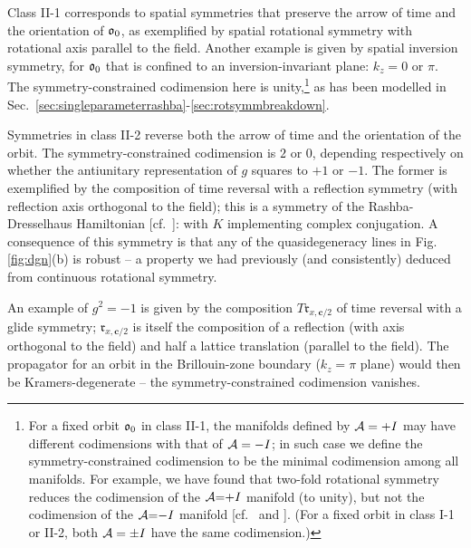 \documentclass[aps, showpacs, twocolumn, notitlepage, superscriptaddress]{revtex4-1}
\begin{document}
Class II-1 corresponds to spatial symmetries that preserve the arrow of time and the orientation of $\mathfrak{o}_0$, as exemplified by spatial rotational symmetry with rotational axis parallel to the field. Another example is given by spatial inversion symmetry, for $\mathfrak{o}_0$ that is confined to an inversion-invariant plane: $k_z=0$ or $\pi$. The symmetry-constrained codimension here is unity,\footnote{For a fixed orbit $\mathfrak{o}_0$ in class II-1, the manifolds defined by ${\cal A}=+I$ may have different codimensions with that of ${\cal A}=-I$; in such case we define the symmetry-constrained codimension to be the minimal codimension among all manifolds. For example, we have found that two-fold rotational symmetry reduces the codimension of the ${\cal A}{=}{+}I$ manifold (to unity), but not the codimension of the ${\cal A}{=}{-}I$ manifold [cf.\  and ]. (For a fixed orbit in class I-1 or II-2, both ${\cal A}=\pm I$ have the same codimension.) } as has been modelled in Sec.\ \ref{sec:singleparameterrashba}-\ref{sec:rotsymmbreakdown}.


Symmetries in class II-2 reverse both the arrow of time and the orientation of the orbit. The symmetry-constrained codimension is $2$ or $0$, depending respectively on whether the antiunitary representation of $g$ squares to $+1$ or $-1$. The former is exemplified by the composition of time reversal with a reflection symmetry (with reflection axis orthogonal to the field); this is a symmetry of the Rashba-Dresselhaus Hamiltonian [cf.\ ]:
with $K$ implementing complex conjugation. A consequence of this symmetry is that any of the quasidegeneracy lines in Fig. \ref{fig:dgn}(b) is robust -- a property we had previously (and consistently) deduced from continuous rotational symmetry. 

An example of $g^2{=}-1$ is given by
the composition $T\mathfrak{r}_{x,\boldsymbol{c}/2}$ of time reversal with a glide symmetry; $\mathfrak{r}_{x,\boldsymbol{c}/2}$ is itself the composition of a reflection (with axis orthogonal to the field) and half a lattice translation (parallel to the field). The propagator for an orbit in the Brillouin-zone boundary ($k_z{=}\pi$ plane) would then be Kramers-degenerate -- the symmetry-constrained codimension vanishes.
\end{document}
